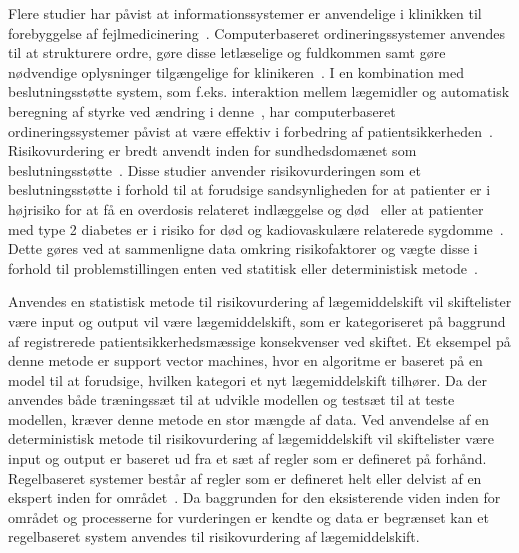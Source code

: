 Flere studier har påvist at informationssystemer er anvendelige i klinikken til forebyggelse af fejlmedicinering~\citep{Agrawal2009, Kaushal2002, Stenner2010, Fischer2008, Simpson2008, Bates2000a}. Computerbaseret ordineringssystemer anvendes til at strukturere ordre, gøre disse letlæselige og fuldkommen samt gøre nødvendige oplysninger tilgængelige for klinikeren~\citep{Agrawal2009,Bates2000a}. I en kombination med beslutningsstøtte system, som f.eks. interaktion mellem lægemidler og automatisk beregning af styrke ved ændring i denne~\citep{Agrawal2009}, har computerbaseret ordineringssystemer påvist at være effektiv i forbedring af patientsikkerheden~\citep{Agrawal2009, Bates2000a}. Risikovurdering er bredt anvendt inden for sundhedsdomænet som beslutningsstøtte~\citep{Geissert2018, Rawshani2018}. Disse studier anvender risikovurderingen som et beslutningsstøtte i forhold til at forudsige sandsynligheden for at patienter er i højrisiko for at få en overdosis relateret indlæggelse og død~\citep{Geissert2018} eller at patienter med type 2 diabetes er i risiko for død og kadiovaskulære relaterede sygdomme~\citep{Rawshani2018}. Dette gøres ved at sammenligne data omkring risikofaktorer og vægte disse i forhold til problemstillingen enten ved statitisk eller deterministisk metode~\citep{Boyko1990}.

Anvendes en statistisk metode til risikovurdering af lægemiddelskift vil skiftelister være input og output vil være lægemiddelskift, som er kategoriseret på baggrund af registrerede patientsikkerhedsmæssige konsekvenser ved skiftet. Et eksempel på denne metode er support vector machines, hvor en algoritme er baseret på en model til at forudsige, hvilken kategori et nyt lægemiddelskift tilhører. Da der anvendes både træningssæt til at udvikle modellen og testsæt til at teste modellen, kræver denne metode en stor mængde af data. Ved anvendelse af en deterministisk metode til risikovurdering af lægemiddelskift vil skiftelister være input og output er baseret ud fra et sæt af regler som er defineret på forhånd. Regelbaseret systemer består af regler som er defineret helt eller delvist af en ekspert inden for området~\citep{Crina2008}. Da baggrunden for den eksisterende viden inden for området og processerne for vurderingen er kendte og data er begrænset kan et regelbaseret system anvendes til risikovurdering af lægemiddelskift. 
 

